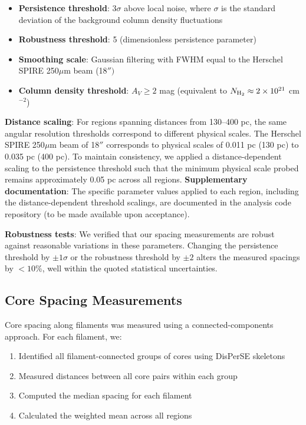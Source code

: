\documentclass[11pt,a4paper]{article}
\begin{document}
\begin{itemize}
    \item \textbf{Persistence threshold}: $3\sigma$ above local noise, where $\sigma$ is the standard deviation of the background column density fluctuations
    \item \textbf{Robustness threshold}: 5 (dimensionless persistence parameter)
    \item \textbf{Smoothing scale}: Gaussian filtering with FWHM equal to the Herschel SPIRE 250$\mu$m beam (18$'')$
    \item \textbf{Column density threshold}: $A_V \geq 2$ mag (equivalent to $N_{\rm H_2} \approx 2 \times 10^{21}$ cm$^{-2}$)
\end{itemize}

\textbf{Distance scaling}: For regions spanning distances from 130--400 pc, the same angular resolution thresholds correspond to different physical scales. The Herschel SPIRE 250$\mu$m beam of 18$''$ corresponds to physical scales of 0.011 pc (130 pc) to 0.035 pc (400 pc). To maintain consistency, we applied a distance-dependent scaling to the persistence threshold such that the minimum physical scale probed remains approximately 0.05 pc across all regions. \textbf{Supplementary documentation}: The specific parameter values applied to each region, including the distance-dependent threshold scalings, are documented in the analysis code repository (to be made available upon acceptance).

\textbf{Robustness tests}: We verified that our spacing measurements are robust against reasonable variations in these parameters. Changing the persistence threshold by $\pm 1\sigma$ or the robustness threshold by $\pm 2$ alters the measured spacings by $<10$\%, well within the quoted statistical uncertainties.

\subsection{Core Spacing Measurements}

Core spacing along filaments was measured using a connected-components approach. For each filament, we:
\begin{enumerate}
    \item Identified all filament-connected groups of cores using DisPerSE skeletons
    \item Measured distances between all core pairs within each group
    \item Computed the median spacing for each filament
    \item Calculated the weighted mean across all regions
\end{enumerate}
\end{document}

